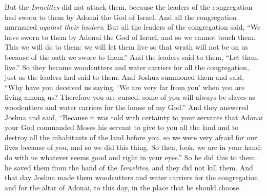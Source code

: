 \begin{biblechapter}
\verse But the \textit{Israelites} did not attack them, because the leaders of the congregation had sworn to them by Adonai the God of Israel. And all the congregation murmured \textit{against their leaders}.
\verse But all the leaders of the congregation said, “We have sworn to them by Adonai the God of Israel, and so we cannot touch them.
\verse This we will do to them: we will let them live so that wrath will not be on us because of the oath we swore to them.”
\verse And the leaders said to them, “Let them live.” So they became woodcutters and water carriers for all the congregation, just as the leaders had said to them.
\verse And Joshua summoned them and said, “Why have you deceived us saying, ‘We are very far from you’ when you are living among us?
\verse Therefore you are cursed; some of you will always be slaves as woodcutters and water carriers for the house of my God.”
\verse And they answered Joshua and said, “Because it was told with certainty to your servants that Adonai your God commanded Moses his servant to give to you all the land and to destroy all the inhabitants of the land before you, so we were very afraid for our lives because of you, and so we did this thing.
\verse So then, look, we are in your hand; do with us whatever seems good and right in your eyes.”
\verse So he did this to them: he saved them from the hand of the \textit{Israelites}, and they did not kill them.
\verse And that day Joshua made them woodcutters and water carriers for the congregation and for the altar of Adonai, to this day, in the place that he should choose.
\end{biblechapter}

